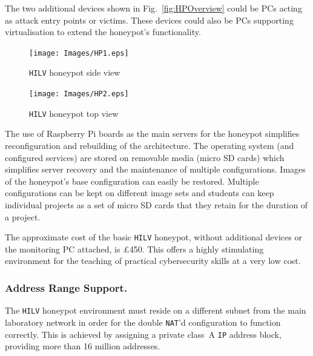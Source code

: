 \documentclass[10pt,journal]{IEEEtran}
\begin{document}
The two additional devices shown in Fig.~\ref{fig:HPOverview} could be PCs
acting as attack entry points or victims. These devices could also be PCs
supporting virtualisation to extend the honeypot's functionality.

\begin{figure}[ht]
  \centering
  \begin{minipage}[h]{0.45\textwidth}
    \texttt{[image: Images/HP1.eps]}
    \caption{\texttt{HILV} honeypot side view\label{fig:HP1}}
  \end{minipage}
  \hfill
  \begin{minipage}[h]{0.45\textwidth}
    \texttt{[image: Images/HP2.eps]}
    \caption{\texttt{HILV} honeypot top view\label{fig:HP2}}
  \end{minipage}
\end{figure}


The use of Raspberry Pi boards as the main servers for the honeypot simplifies
reconfiguration and rebuilding of the architecture.  The operating system (and
configured services) are stored on removable media (micro SD cards) which
simplifies server recovery and the maintenance of multiple configurations.
Images of the honeypot's base configuration can easily be restored. Multiple
configurations can be kept on different image sets and students can keep
individual projects as a set of micro SD cards that they retain for the
duration of a project.

The approximate cost of the basic \texttt{HILV} honeypot, without additional
devices or the monitoring PC attached, is \pounds450.  This offers a highly
stimulating environment for the teaching of practical cybersecurity skills at a
very low cost.

\subsubsection{Address Range Support.}

The \texttt{HILV} honeypot environment must reside on a different subnet from
the main laboratory network in order for the double \texttt{NAT}'d
configuration to function correctly. This is achieved by assigning a private
class~A \texttt{IP} address block, providing more than 16 million addresses.
\end{document}
